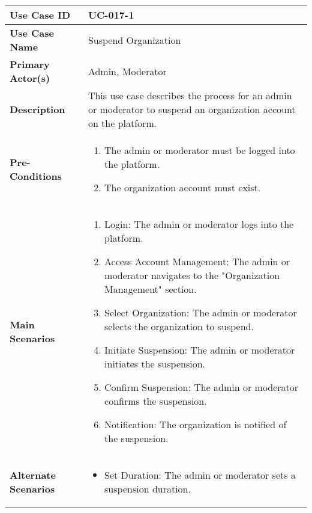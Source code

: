 \begin{table}[!ht]
    \centering
    \renewcommand{\arraystretch}{1.3} %
    \begin{tabularx}{\textwidth}{|l|X|}
        \hline
        \textbf{Use Case ID} & UC-017-1 \\
        \hline
        \textbf{Use Case Name} & Suspend Organization \\
        \hline
        \textbf{Primary Actor(s)} & Admin, Moderator \\
        \hline
        \textbf{Description} & This use case describes the process for an admin or moderator to suspend an organization account on the platform. \\
        \hline
        \textbf{Pre-Conditions} & 
        \begin{enumerate}[label=\arabic*.,itemsep=0pt]
            \item The admin or moderator must be logged into the platform.
            \item The organization account must exist.
        \end{enumerate} \\
        \hline
        \textbf{Main Scenarios} & 
        \begin{enumerate}[label=\arabic*.,itemsep=0pt]
            \item Login: The admin or moderator logs into the platform.
            \item Access Account Management: The admin or moderator navigates to the "Organization Management" section.
            \item Select Organization: The admin or moderator selects the organization to suspend.
            \item Initiate Suspension: The admin or moderator initiates the suspension.
            \item Confirm Suspension: The admin or moderator confirms the suspension.
            \item Notification: The organization is notified of the suspension.
        \end{enumerate} \\
        \hline
        \textbf{Alternate Scenarios} & 
        \begin{itemize}[label=--,itemsep=0pt]
            \item Set Duration: The admin or moderator sets a suspension duration.
        \end{itemize} \\

\end{tabularx}
\end{table}

